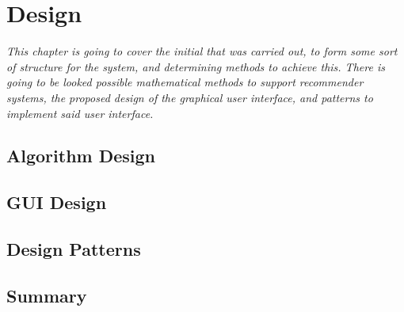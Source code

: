 \chapter{Design}

\textit{This chapter is going to cover the initial that was carried out, to form some sort of structure for the system, and determining methods to achieve this. There is going to be looked possible mathematical methods to support recommender systems, the proposed design of the graphical user interface, and patterns to implement said user interface.}

\section{Algorithm Design}
\label{AlgDes}

\section{GUI Design}
\label{GUIDes}

\section{Design Patterns}
\label{DesPatterns}

\section{Summary}
\label{DesSummary}
